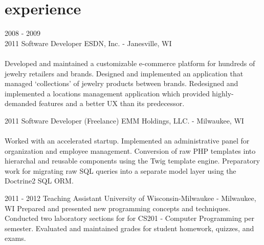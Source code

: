 \documentclass[]{fritz-resume}
\begin{document}

\section{experience}

\begin{entrylist}
	\entry
		{2008 - 2009 \\ 2011}
		{Software Developer}
		{ESDN, Inc. - Janesville, WI}
		{
			 \\ \\
			Developed and maintained a customizable e-commerce platform for hundreds of jewelry retailers and brands. Designed and implemented an application that managed `collections' of jewelry products between brands. Redesigned and implemented a locations management application which provided highly-demanded features and a better UX than its predecessor.
		}
	
	\entry
		{2011}
		{Software Developer (Freelance)}
		{EMM Holdings, LLC. - Milwaukee, WI}
		{
			 \\ \\
			Worked with an accelerated startup. Implemented an administrative panel for organization and employee management. Conversion of raw PHP templates into hierarchal and reusable components using the Twig template engine. Preparatory work for migrating raw SQL queries into a separate model layer using the Doctrine2 SQL ORM.
		}
	
	\entry
		{2011 - 2012}
		{Teaching Assistant}
		{University of Wisconsin-Milwaukee - Milwaukee, WI}
		{
			Prepared and presented new programming concepts and techniques. Conducted two laboratory sections for for CS201 - Computer Programming per semester. Evaluated and maintained grades for student homework, quizzes, and exams.
		}
\end{entrylist}
\end{document}
